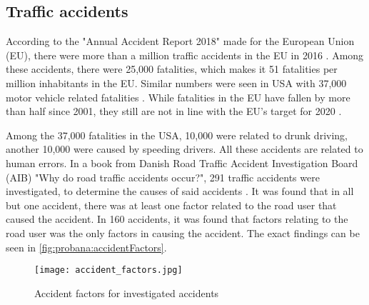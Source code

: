 \subsection{Traffic accidents}
According to the "Annual Accident Report 2018" made for the European Union (EU), there were more than a million traffic accidents in the EU in 2016 \cite{annual_accident_report_2018}.
Among these accidents, there were 25,000 fatalities, which makes it 51 fatalities per million inhabitants in the EU.
Similar numbers were seen in USA with 37,000 motor vehicle related fatalities \cite{vi.chilukuri.ctrdot.gov_usdot_2017}.
While fatalities in the EU have fallen by more than half since 2001, they still are not in line with the EU's target for 2020 \cite{khan_road_2018}.

Among the 37,000 fatalities in the USA, 10,000 were related to drunk driving, another 10,000 were caused by speeding drivers\cite{vi.chilukuri.ctrdot.gov_usdot_2017}.
All these accidents are related to human errors.
In a book from Danish Road Traffic Accident Investigation Board (AIB) "Why do road traffic accidents occur?", 291 traffic accidents were investigated, to determine the causes of said accidents \cite{danmark_why_accidents_happen_2014}.
It was found that in all but one accident, there was at least one factor related to the road user that caused the accident.
In 160 accidents, it was found that factors relating to the road user was the only factors in causing the accident.
The exact findings can be seen in \autoref{fig:probana:accidentFactors}.

\begin{figure} [H]
    \centering
    \texttt{[image: accident\_factors.jpg]}
    \caption{Accident factors for investigated accidents\cite{danmark_why_accidents_happen_2014}}
    \label{fig:probana:accidentFactors}
\end{figure}
